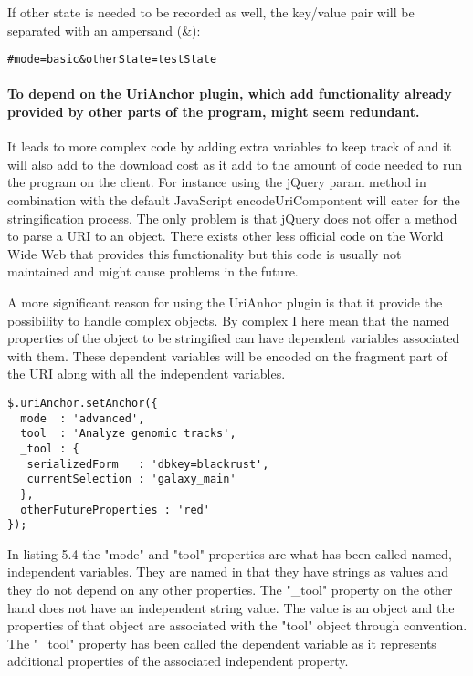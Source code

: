 \documentclass[english]{ifimaster}
\begin{document}
If other state is needed to be recorded as well, the key/value pair will be separated with an ampersand (\&):

\begin{lstlisting}[caption=Standard key/value separation of the URI parameters]
	#mode=basic&otherState=testState
\end{lstlisting}

\paragraph{To depend on the UriAnchor plugin, which add functionality already provided by other parts of the program, might seem redundant.}It leads to more complex code by adding extra variables to keep track of and it will also add to the download cost as it add to the amount of code needed to run the program on the client. For instance using the jQuery param method in combination with the default JavaScript encodeUriCompontent will cater for the stringification process. The only problem is that jQuery does not offer a method to parse a URI to an object. There exists other less official code on the World Wide Web that provides this functionality but this code is usually not maintained and might cause problems in the future. 

A more significant reason for using the UriAnhor plugin is that it provide the possibility to handle complex objects. By complex I here mean that the named properties of the object to be stringified can have dependent variables associated with them. These dependent variables will be encoded on the fragment part of the URI along with all the independent variables.

\begin{lstlisting}[caption=The UriAnchor plugin. Parsed complex object.]
	$.uriAnchor.setAnchor({
  mode  : 'advanced',
  tool  : 'Analyze genomic tracks',
  _tool : {
   serializedForm   : 'dbkey=blackrust',
   currentSelection : 'galaxy_main'
  },
  otherFutureProperties : 'red'
});
\end{lstlisting}

In listing 5.4 the "mode" and "tool" properties are what has been called named, independent variables. They are named in that they have strings as values and they do not depend on any other properties. The "\_tool" property on the other hand does not have an independent string value. The value is an object and the properties of that object are associated with the "tool" object through convention. The "\_tool" property has been called the dependent variable as it represents additional properties of the associated independent property. 
\end{document}
